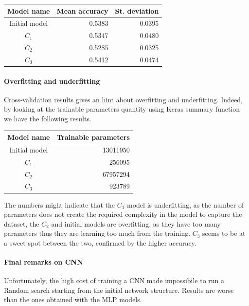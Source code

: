 \begin{center}
    \begin{tabular}{ |c|r|r| } 
        \hline
        Model name & Mean accuracy & St. deviation \\
        \hline
        Initial model & 0.5383 & 0.0395 \\
        $C_1$ & 0.5347 & 0.0480 \\
        $C_2$ & 0.5285 & 0.0325 \\
        $C_3$ & 0.5412 & 0.0474 \\
        \hline
    \end{tabular}
\end{center}

\paragraph{Overfitting and underfitting}
Cross-validation results gives an hint about overfitting and underfitting. Indeed, 
by looking at the trainable parameters quantity using Keras summary function we have the following results.
\begin{center}
    \begin{tabular}{ |c|r| } 
        \hline
        Model name & Trainable parameters\\
        \hline
        Initial model & 13011950 \\
        $C_1$ & 256095 \\
        $C_2$ & 67957294 \\
        $C_3$ & 923789 \\
        \hline
    \end{tabular}
\end{center}
The numbers might indicate that the $C_1$ model is underfitting, as the number 
of parameters does not create the required complexity in the model to capture the dataset, 
the $C_2$ and initial models are overfitting, as they have too many parameters 
thus they are learning too much from the training. 
$C_3$ seems to be at a sweet spot between the two, confirmed by the higher accuracy.

\paragraph{Final remarks on CNN}
Unfortunately, the high cost of training a CNN made impossibile to run a Random search 
starting from the initial network structure. Results are worse than the ones obtained 
with the MLP models. 
\newpage